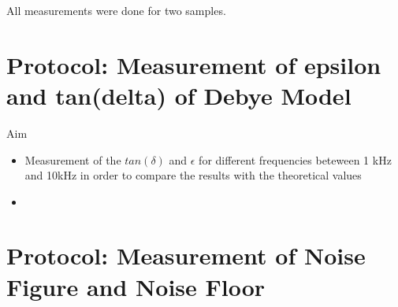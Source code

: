 All measurements were done for two samples. 



\section{Protocol: Measurement of epsilon and tan(delta) of Debye Model}
\large{Aim} \\
\begin{itemize}
\item Measurement of the $tan(\delta)$ and $\epsilon$ for different frequencies beteween 1 kHz and 10kHz in order to compare the results with the theoretical values
\item  
\end{itemize}

\section{Protocol: Measurement of Noise Figure and Noise Floor}